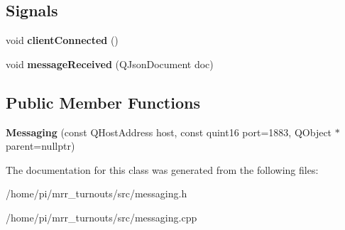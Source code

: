 \subsection*{Signals}
\begin{DoxyCompactItemize}
\item 
\mbox{\label{classMessaging_a0576dc58ba52f6dd1ca55e8a720c423b}} 
void {\bfseries client\+Connected} ()
\item 
\mbox{\label{classMessaging_a2a96e2e73060387af9d5abc5d9eb71a4}} 
void {\bfseries message\+Received} (Q\+Json\+Document doc)
\end{DoxyCompactItemize}
\subsection*{Public Member Functions}
\begin{DoxyCompactItemize}
\item 
\mbox{\label{classMessaging_a3b1df35f7818f802a808871d03462193}} 
{\bfseries Messaging} (const Q\+Host\+Address host, const quint16 port=1883, Q\+Object $\ast$parent=nullptr)
\end{DoxyCompactItemize}


The documentation for this class was generated from the following files\+:\begin{DoxyCompactItemize}
\item 
/home/pi/mrr\+\_\+turnouts/src/messaging.\+h\item 
/home/pi/mrr\+\_\+turnouts/src/messaging.\+cpp\end{DoxyCompactItemize}
